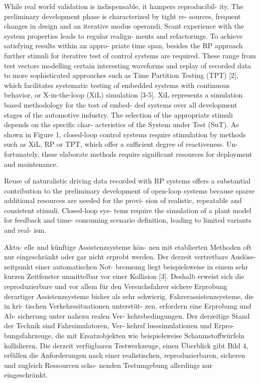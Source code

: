 While real world validation is indispensable, it hampers reproducibil- ity. The preliminary development phase is characterized by tight re- sources, frequent changes in design and an iterative modus operandi. Scant experience with the system properties leads to regular realign- ments and refactorings. To achieve satisfying results within an appro- priate time span, besides the RP approach further stimuli for iterative test of control systems are required. These range from test vectors modelling certain interesting waveforms and replay of recorded data to more sophisticated approaches such as Time Partition Testing (TPT) [2], which facilitates systematic testing of embedded systems with continuous behavior, or X-in-the-loop (XiL) simulation [3-5]. XiL represents a simulation based methodology for the test of embed- ded systems over all development stages of the automotive industry. The selection of the appropriate stimuli depends on the specific char- acteristics of the System under Test (SuT). As shown in Figure 1, closed-loop control systems require stimulation by methods such as XiL, RP or TPT, which offer a sufficient degree of reactiveness. Un- fortunately, these elaborate methods require significant resources for deployment and maintenance. \cite{bach2017reactive}

Reuse of naturalistic driving data recorded with RP systems offers a substantial contribution to the preliminary development of open-loop systems because sparse additional resources are needed for the provi- sion of realistic, repeatable and consistent stimuli. Closed-loop sys- tems require the simulation of a plant model for feedback and time- consuming scenario definition, leading to limited variants and real- ism. \cite{bach2017reactive}

Aktu- elle und künftige Assistenzsysteme kön- nen mit etablierten Methoden oft nur eingeschränkt oder gar nicht erprobt werden. Der derzeit vertretbare Auslöse- zeitpunkt einer automatischen Not- bremsung liegt beispielsweise in einem sehr kurzen Zeitfenster unmittelbar vor einer Kollision [3]. Deshalb erweist sich die reproduzierbare und vor allem für den Versuchsfahrer sichere Erprobung derartiger Assistenzsysteme bisher als sehr schwierig. Fahrerassistenzsysteme, die in kri- tischen Verkehrssituationen unterstüt- zen, erfordern eine Erprobung und Ab- sicherung unter nahezu realen Ver- kehrsbedingungen. Der derzeitige Stand der Technik sind Fahrsimulatoren, Ver- kehrsf lusssimulationen und Erpro- bungsfahrzeuge, die mit Ersatzobjekten wie beispielsweise Schaumstoffwürfeln kollidieren. Die derzeit verfügbaren Testwerkzeuge, einen Überblick gibt Bild 4, erfüllen die Anforderungen nach einer realistischen, reproduzierbaren, sicheren und zugleich Ressourcen scho- nenden Testumgebung allerdings nur eingeschränkt. \cite{bock2008vehicle}

